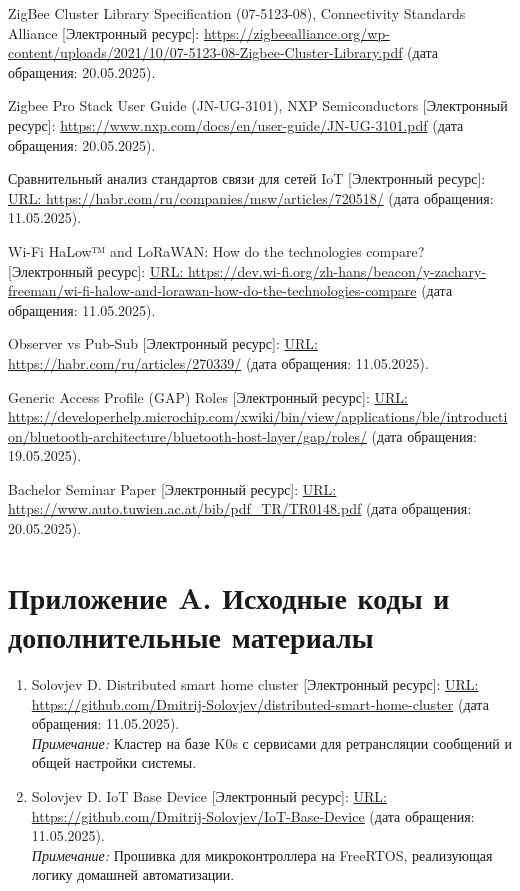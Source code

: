 \documentclass[a4paper,12pt]{article}
\begin{document}
\begin{thebibliography}{40}
 ZigBee Cluster Library Specification (07-5123-08), Connectivity Standards Alliance [Электронный ресурс]: \url{https://zigbeealliance.org/wp-content/uploads/2021/10/07-5123-08-Zigbee-Cluster-Library.pdf} (дата обращения: 20.05.2025).

 Zigbee Pro Stack User Guide (JN-UG-3101), NXP Semiconductors [Электронный ресурс]: \url{https://www.nxp.com/docs/en/user-guide/JN-UG-3101.pdf} (дата обращения: 20.05.2025).

 Сравнительный анализ стандартов связи для сетей IoT [Электронный ресурс]: \url{URL: https://habr.com/ru/companies/msw/articles/720518/} (дата обращения: 11.05.2025).

 Wi-Fi HaLow™ and LoRaWAN: How do the technologies compare? [Электронный ресурс]: \url{URL: https://dev.wi-fi.org/zh-hans/beacon/y-zachary-freeman/wi-fi-halow-and-lorawan-how-do-the-technologies-compare} (дата обращения: 11.05.2025).

 Observer vs Pub-Sub [Электронный ресурс]: \url{URL: https://habr.com/ru/articles/270339/} (дата обращения: 11.05.2025).

 Generic Access Profile (GAP) Roles [Электронный ресурс]: \url{URL: https://developerhelp.microchip.com/xwiki/bin/view/applications/ble/introduction/bluetooth-architecture/bluetooth-host-layer/gap/roles/} (дата обращения: 19.05.2025).

 Bachelor Seminar Paper  [Электронный ресурс]: \url{URL: https://www.auto.tuwien.ac.at/bib/pdf_TR/TR0148.pdf} (дата обращения: 20.05.2025).

\end{thebibliography}

\newpage
\appendix
\renewcommand{\thesection}{\Alph{section}} %

\section*{Приложение A. Исходные коды и дополнительные материалы}

\begin{enumerate}[label=\arabic*.]
  \item Solovjev D. Distributed smart home cluster  [Электронный ресурс]: 
        \url{URL: https://github.com/Dmitrij-Solovjev/distributed-smart-home-cluster}
        (дата обращения: 11.05.2025). \\
        \emph{Примечание:} Кластер на базе K0s с сервисами для ретрансляции сообщений и общей настройки системы.
        
  \item Solovjev D. IoT Base Device [Электронный ресурс]: 
        \url{URL: https://github.com/Dmitrij-Solovjev/IoT-Base-Device} 
        (дата обращения: 11.05.2025). \\
        \emph{Примечание:} Прошивка для микроконтроллера на FreeRTOS, реализующая логику домашней автоматизации.
\end{enumerate}
\end{document}
